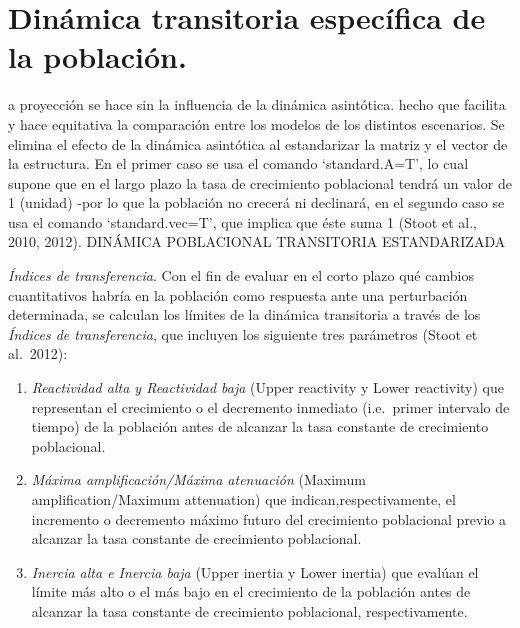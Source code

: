 \documentclass[
]{book}
\theoremstyle{definition}
\theoremstyle{definition}
\theoremstyle{definition}
\theoremstyle{definition}
\theoremstyle{remark}
\begin{document}
\section{Dinámica transitoria específica de la población.}\label{dinuxe1mica-transitoria-especuxedfica-de-la-poblaciuxf3n.}

a proyección se hace sin la influencia de la dinámica asintótica. hecho que facilita y hace equitativa la comparación entre los modelos de los distintos escenarios. Se elimina el efecto de la dinámica asintótica al estandarizar la matriz y el vector de la estructura. En el primer caso se usa el comando `standard.A=T', lo cual supone que en el largo plazo la tasa de crecimiento poblacional tendrá un valor de 1 (unidad) -por lo que la población no crecerá ni declinará, en el segundo caso se usa el comando `standard.vec=T', que implica que éste suma 1 (Stoot et al., 2010, 2012). DINÁMICA POBLACIONAL TRANSITORIA ESTANDARIZADA

\emph{Índices de transferencia}. Con el fin de evaluar en el corto plazo qué cambios cuantitativos habría en la población como respuesta ante una perturbación determinada, se calculan los límites de la dinámica transitoria a través de los \emph{Índices de transferencia}, que incluyen los siguiente tres parámetros (Stoot et al.~2012):

\begin{enumerate}
\def\labelenumi{\alph{enumi})}
\item
  \emph{Reactividad alta y Reactividad baja} (Upper reactivity y Lower reactivity) que representan el crecimiento o el decremento inmediato (i.e.~primer intervalo de tiempo) de la población antes de alcanzar la tasa constante de crecimiento poblacional.
\item
  \emph{Máxima amplificación/Máxima atenuación} (Maximum amplification/Maximum attenuation) que indican,respectivamente, el incremento o decremento máximo futuro del crecimiento poblacional previo a alcanzar la tasa constante de crecimiento poblacional.
\item
  \emph{Inercia alta e Inercia baja} (Upper inertia y Lower inertia) que evalúan el límite más alto o el más bajo en el crecimiento de la población antes de alcanzar la tasa constante de crecimiento poblacional, respectivamente.
\end{enumerate}
\end{document}
